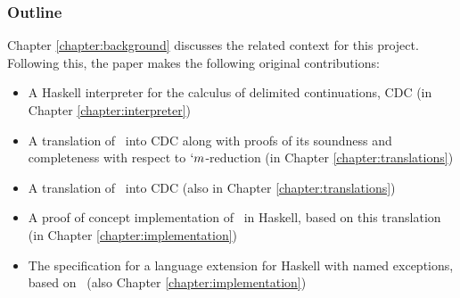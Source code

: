 \subsubsection{Outline}
Chapter \ref{chapter:background} discusses the related context for this project. Following this, the paper makes the following original contributions:
\begin{itemize}
\item A Haskell interpreter for the calculus of delimited continuations, CDC (in Chapter \ref{chapter:interpreter})
\item A translation of \lmu\ into CDC along with proofs of its soundness and completeness with respect to $`m$-reduction (in Chapter \ref{chapter:translations})
\item A translation of \ltry\ into CDC (also in Chapter \ref{chapter:translations}) 
\item A proof of concept implementation of \ltry\ in Haskell, based on this translation (in Chapter \ref{chapter:implementation})
\item The specification for a language extension for Haskell with named exceptions, based on \ltry\ (also Chapter \ref{chapter:implementation})
\end{itemize}
